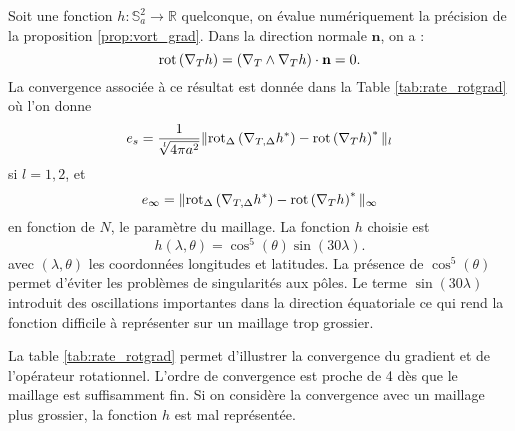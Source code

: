 Soit une fonction $h : \mathbb{S}_a^2 \rightarrow \mathbb{R}$ quelconque, on évalue numériquement la précision de la proposition \ref{prop:vort_grad}. Dans la direction normale $\mathbf{n}$, on a :
\begin{equation}
\text{rot}\left( \nabla_T h \right) = \left( \nabla_T \wedge \nabla_T h \right) \cdot \mathbf{n} = 0.
\label{eq:rot_grad}
\end{equation}
La convergence associée à ce résultat est donnée dans la Table \ref{tab:rate_rotgrad} où l'on donne
\begin{equation}
e_s = \dfrac{1}{\sqrt[l]{4 \pi a^2}} \| \text{rot}_{\Delta} \left( \nabla_{T,\Delta} h^* \right) - \text{rot} \left( \nabla_{T} h \right)^* \|_l
\end{equation}
si $l= 1,2$, et
\begin{equation}
e_{\infty} =  \| \text{rot}_{\Delta} \left( \nabla_{T,\Delta} h^* \right) - \text{rot} \left( \nabla_{T} h \right)^* \|_{\infty}
\end{equation}
en fonction de $N$, le paramètre du maillage. La fonction $h$ choisie est 
\begin{equation}
h(\lambda, \theta) = \cos^5 ( \theta ) \sin ( 30 \lambda ).
\end{equation}
avec $(\lambda, \theta)$ les coordonnées longitudes et latitudes.
La présence de $\cos^5 (\theta)$ permet d'éviter les problèmes de singularités aux pôles. Le terme $\sin ( 30 \lambda)$ introduit des oscillations importantes dans la direction équatoriale ce qui rend la fonction difficile à représenter sur un maillage trop grossier.

La table \ref{tab:rate_rotgrad} permet d'illustrer la convergence du gradient et de l'opérateur rotationnel. L'ordre de convergence est proche de 4 dès que le maillage est suffisamment fin. Si on considère la convergence avec un maillage plus grossier, la fonction $h$ est mal représentée.

